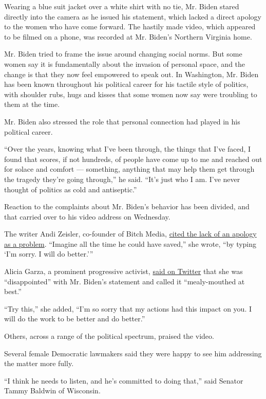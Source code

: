 Wearing a blue suit jacket over a white shirt with no tie, Mr. Biden
stared directly into the camera as he issued his statement, which lacked
a direct apology to the women who have come forward. The hastily made
video, which appeared to be filmed on a phone, was recorded at Mr.
Biden's Northern Virginia home.

Mr. Biden tried to frame the issue around changing social norms. But
some women say it is fundamentally about the invasion of personal space,
and the change is that they now feel empowered to speak out. In
Washington, Mr. Biden has been known throughout his political career for
his tactile style of politics, with shoulder rubs, hugs and kisses that
some women now say were troubling to them at the time.

Mr. Biden also stressed the role that personal connection had played in
his political career.

``Over the years, knowing what I've been through, the things that I've
faced, I found that scores, if not hundreds, of people have come up to
me and reached out for solace and comfort --- something, anything that
may help them get through the tragedy they're going through,'' he said.
``It's just who I am. I've never thought of politics as cold and
antiseptic.''

Reaction to the complaints about Mr. Biden's behavior has been divided,
and that carried over to his video address on Wednesday.

The writer Andi Zeisler, co-founder of Bitch Media,
\href{https://twitter.com/andizeisler/status/1113535002287804417}{cited
the lack of an apology as a problem}. ``Imagine all the time he could
have saved,'' she wrote, ``by typing `I'm sorry. I will do better.'''

Alicia Garza, a prominent progressive activist,
\href{https://twitter.com/aliciagarza/status/1113556567347974144}{said
on Twitter} that she was ``disappointed'' with Mr. Biden's statement and
called it ``mealy-mouthed at best.''

``Try this,'' she added, ``I'm so sorry that my actions had this impact
on you. I will do the work to be better and do better.''

Others, across a range of the political spectrum, praised the video.

Several female Democratic lawmakers said they were happy to see him
addressing the matter more fully.

``I think he needs to listen, and he's committed to doing that,'' said
Senator Tammy Baldwin of Wisconsin.

